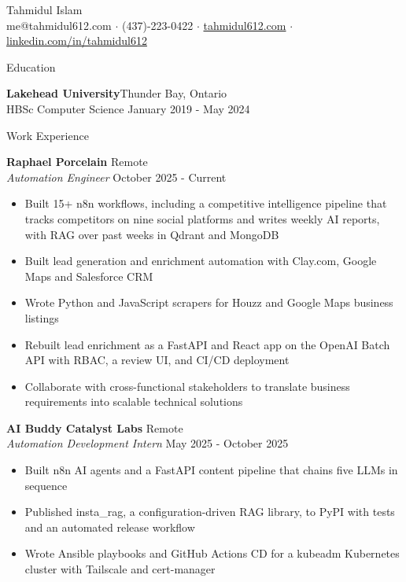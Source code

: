 \documentclass[letterpaper,10pt]{article}
\newcommand{\header} [1] {
  {\hspace*{-18pt}\vspace*{5pt} #1}
  \vspace*{-3pt} \hrulefill \\ \vspace*{5pt}
}
\begin{document}
\begin{sloppypar}
  \vspace*{-30pt}
  \sloppy
  \setlength{\emergencystretch}{5em}

  \begin{center}
    {\Huge Tahmidul Islam} \\
    me@tahmidul612.com $\cdot$ (437)-223-0422 $\cdot$ \href{https://tahmidul612.com}{tahmidul612.com} $\cdot$ \href{https://www.linkedin.com/in/tahmidul612}{linkedin.com/in/tahmidul612} \\
  \end{center}

  \header{Education}
  \textbf{Lakehead University}\hfill Thunder Bay, Ontario\\
  HBSc Computer Science \hfill January 2019 - May 2024\\
  \vspace{1mm}

  \header{Work Experience}
  \textbf{Raphael Porcelain} \hfill Remote\\
  \textit{Automation Engineer} \hfill October 2025 - Current\\
  \vspace{1mm}
  \begin{itemize}
    \item Built 15+ n8n workflows, including a competitive intelligence pipeline that tracks competitors on nine social platforms and writes weekly AI reports, with RAG over past weeks in Qdrant and MongoDB
    \item Built lead generation and enrichment automation with Clay.com, Google Maps and Salesforce CRM
    \item Wrote Python and JavaScript scrapers for Houzz and Google Maps business listings
    \item Rebuilt lead enrichment as a FastAPI and React app on the OpenAI Batch API with RBAC, a review UI, and CI/CD deployment
    \item Collaborate with cross-functional stakeholders to translate business requirements into scalable technical solutions
  \end{itemize}
  \vspace{1mm}
  \textbf{AI Buddy Catalyst Labs} \hfill Remote\\
  \textit{Automation Development Intern} \hfill May 2025 - October 2025\\
  \vspace{1mm}
  \begin{itemize}
    \item Built n8n AI agents and a FastAPI content pipeline that chains five LLMs in sequence
    \item Published insta\_rag, a configuration-driven RAG library, to PyPI with tests and an automated release workflow
    \item Wrote Ansible playbooks and GitHub Actions CD for a kubeadm Kubernetes cluster with Tailscale and cert-manager
  \end{itemize}
  \vspace{1mm}


\end{sloppypar}
\end{document}
